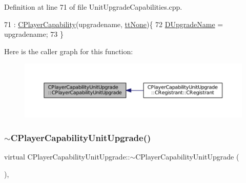 Definition at line 71 of file Unit\+Upgrade\+Capabilities.\+cpp.


\begin{DoxyCode}
71                                                                                        : 
      \hyperlink{classCPlayerCapability_a303de62aba5d3f65d9a8e013c64a96c1}{CPlayerCapability}(upgradename, \hyperlink{classCPlayerCapability_a9d3450ed1532fd536bd6cbb1e2eef02fac78f0e806a6b0ead030d63c27c9ce929}{ttNone})\{
72     \hyperlink{classCPlayerCapabilityUnitUpgrade_a5de8bffd6935c699f431329ad4ee5eec}{DUpgradeName} = upgradename;
73 \}
\end{DoxyCode}
Here is the caller graph for this function\+:\nopagebreak
\begin{figure}[H]
\begin{center}
\leavevmode
\includegraphics[width=350pt]{classCPlayerCapabilityUnitUpgrade_ac87129322f9f31cc271ee3de33502c56_icgraph}
\end{center}
\end{figure}
\hypertarget{classCPlayerCapabilityUnitUpgrade_a7784e1fb92a26acb700c06ab38d2733b}{}\label{classCPlayerCapabilityUnitUpgrade_a7784e1fb92a26acb700c06ab38d2733b} 
\subsubsection{\texorpdfstring{$\sim$\+C\+Player\+Capability\+Unit\+Upgrade()}{~CPlayerCapabilityUnitUpgrade()}}
{\footnotesize\ttfamily virtual C\+Player\+Capability\+Unit\+Upgrade\+::$\sim$\+C\+Player\+Capability\+Unit\+Upgrade (\begin{DoxyParamCaption}{ }\end{DoxyParamCaption})\hspace{0.3cm}{\ttfamily [inline]}, {\ttfamily [virtual]}}



